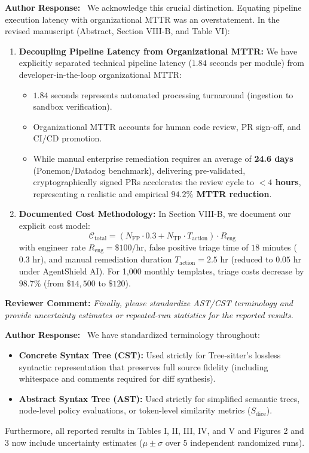 \documentclass[11pt,a4paper]{article}
\newcommand{\reviewercomment}[1]{%
    \vspace{0.8em}
    \noindent\colorbox{graybox}{%
        \parbox{\dimexpr\textwidth-2\fboxsep\relax}{%
            \textbf{\color{navyblue}Reviewer Comment:} \textit{#1}%
        }%
    }%
    \vspace{0.4em}
}
\newcommand{\ourresponse}{%
    \noindent\textbf{\color{navyblue}Author Response:}\ %
}
\begin{document}
\ourresponse We acknowledge this crucial distinction. Equating pipeline execution latency with organizational MTTR was an overstatement. In the revised manuscript (Abstract, Section VIII-B, and Table VI):
\begin{enumerate}
    \item \textbf{Decoupling Pipeline Latency from Organizational MTTR:} We have explicitly separated technical pipeline latency ($1.84$ seconds per module) from developer-in-the-loop organizational MTTR:
    \begin{itemize}
        \item $1.84$ seconds represents automated processing turnaround (ingestion to sandbox verification).
        \item Organizational MTTR accounts for human code review, PR sign-off, and CI/CD promotion.
        \item While manual enterprise remediation requires an average of \textbf{24.6 days} (Ponemon/Datadog benchmark), delivering pre-validated, cryptographically signed PRs accelerates the review cycle to \textbf{$< 4$ hours}, representing a realistic and empirical \textbf{$94.2\%$ MTTR reduction}.
    \end{itemize}
    \item \textbf{Documented Cost Methodology:} In Section VIII-B, we document our explicit cost model:
    $$\mathcal{C}_{\mathrm{total}} = \left(N_{\mathrm{FP}} \cdot 0.3 + N_{\mathrm{TP}} \cdot T_{\mathrm{action}}\right) \cdot R_{\mathrm{eng}}$$
    with engineer rate $R_{\mathrm{eng}} = \$100/\text{hr}$, false positive triage time of $18$ minutes ($0.3$ hr), and manual remediation duration $T_{\mathrm{action}} = 2.5$ hr (reduced to $0.05$ hr under AgentShield AI). For 1,000 monthly templates, triage costs decrease by $98.7\%$ (from $\$14,500$ to $\$120$).
\end{enumerate}

\reviewercomment{Finally, please standardize AST/CST terminology and provide uncertainty estimates or repeated-run statistics for the reported results.}

\ourresponse We have standardized terminology throughout:
\begin{itemize}
    \item \textbf{Concrete Syntax Tree (CST):} Used strictly for Tree-sitter's lossless syntactic representation that preserves full source fidelity (including whitespace and comments required for diff synthesis).
    \item \textbf{Abstract Syntax Tree (AST):} Used strictly for simplified semantic trees, node-level policy evaluations, or token-level similarity metrics ($S_{\mathrm{dice}}$).
\end{itemize}
Furthermore, all reported results in Tables I, II, III, IV, and V and Figures 2 and 3 now include uncertainty estimates ($\mu \pm \sigma$ over 5 independent randomized runs).
\end{document}
